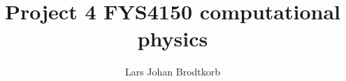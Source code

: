 \documentclass[10pt,a4paper]{article}
\begin{document}
\title{Project 4 FYS4150 computational physics}
\author{Lars Johan Brodtkorb}
\maketitle


\tableofcontents
\newpage






%
%
\end{document}
